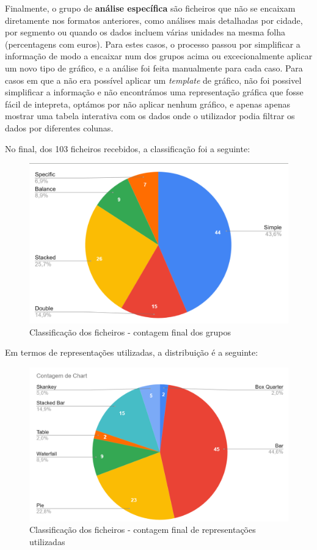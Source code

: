 Finalmente, o grupo de \textbf{análise específica} são ficheiros que não se encaixam diretamente nos formatos anteriores, como análises mais detalhadas por cidade, por segmento ou quando os dados incluem várias unidades na mesma folha (percentagens com euros). Para estes casos, o processo passou por simplificar a informação de modo a encaixar num dos grupos acima ou excecionalmente aplicar um novo tipo de gráfico, e a análise foi feita manualmente para cada caso. Para casos em que a não era possível aplicar um \textit{template} de gráfico, não foi possivel simplificar a informação e não encontrámos uma representação gráfica que fosse fácil de intepreta, optámos por não aplicar nenhum gráfico, e apenas apenas mostrar uma tabela interativa com os dados onde o utilizador podia filtrar os dados por diferentes colunas.


No final, dos 103 ficheiros recebidos, a classificação foi a seguinte:
\begin{figure}[h]
    \centering
    \includegraphics[width=\textwidth]{./img/stats1}
 \caption{Classificação dos ficheiros - contagem final dos grupos}
 \end{figure}

Em termos de representações utilizadas, a distribuição é a seguinte:
\begin{figure}[h]
    \centering
    \includegraphics[width=\textwidth]{./img/stats2}
 \caption{Classificação dos ficheiros - contagem final de representações utilizadas}
 \end{figure}


